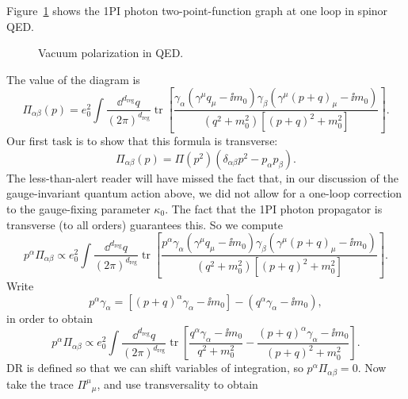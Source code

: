 Figure~\ref{fig:9.6} shows the 1PI photon two-point-function graph at one loop in spinor
QED.
\begin{figure}[htbp]
  \centering
  
  \caption{Vacuum polarization in QED.}
  \label{fig:9.6}
\end{figure}

The value of the diagram is
\[
  \Pi_{\alpha\beta}(p)=e_0^2\int\frac{\dd^{d_{\mathrm{reg}}}q}{(2\pi)^{d_{\mathrm{reg}}}}
  \operatorname{tr}\!\left[
  \frac{\gamma_\alpha(\gamma^\mu q_\mu-\ii m_0)\gamma_\beta
  (\gamma^\mu(p+q)_\mu-\ii m_0)}
  {(q^2+m_0^2)[(p+q)^2+m_0^2]}\right].
\]
Our first task is to show that this formula is transverse:
\[
  \Pi_{\alpha\beta}(p)=\Pi(p^2)
  (\delta_{\alpha\beta}p^2-p_\alpha p_\beta).
\]
The less-than-alert reader will have missed the fact that, in our discussion of
the gauge-invariant quantum action above, we did not allow for a one-loop
correction to the gauge-fixing parameter $\kappa_0$. The fact that the 1PI photon
propagator is transverse (to all orders) guarantees this. So we compute
\[
  p^\alpha\Pi_{\alpha\beta}\propto e_0^2\int\frac{\dd^{d_{\mathrm{reg}}}q}{(2\pi)^{d_{\mathrm{reg}}}}
  \operatorname{tr}\!\left[
  \frac{p^\alpha\gamma_\alpha(\gamma^\mu q_\mu-\ii m_0)\gamma_\beta
  (\gamma^\mu(p+q)_\mu-\ii m_0)}
  {(q^2+m_0^2)[(p+q)^2+m_0^2]}\right].
\]
Write
\[
  p^\alpha\gamma_\alpha
  =[(p+q)^\alpha\gamma_\alpha-\ii m_0]
  -(q^\alpha\gamma_\alpha-\ii m_0),
\]
in order to obtain
\[
  p^\alpha\Pi_{\alpha\beta}\propto e_0^2\int\frac{\dd^{d_{\mathrm{reg}}}q}{(2\pi)^{d_{\mathrm{reg}}}}
  \operatorname{tr}\!\left[
  \frac{q^\alpha\gamma_\alpha-\ii m_0}{q^2+m_0^2}
  -\frac{(p+q)^\alpha\gamma_\alpha-\ii m_0}{(p+q)^2+m_0^2}
  \right].
\]
DR is defined so that we can shift variables of integration, so
$p^\alpha\Pi_{\alpha\beta}=0$. Now take the trace $\Pi^\mu{}_{\mu}$, and use
transversality to obtain

